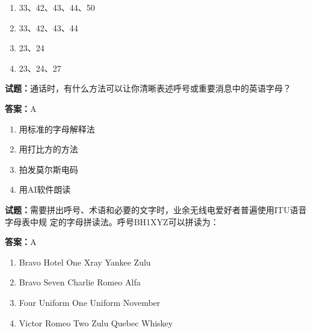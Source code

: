 \documentclass{ctexbook}
\begin{document}
\begin{enumerate}[leftmargin=3em]
  \item 33、42、43、44、50 

  \item 33、42、43、44 

  \item 23、24 

  \item 23、24、27 

\end{enumerate}





\vspace{1em}

\textbf{试题：}通话时，有什么方法可以让你清晰表述呼号或重要消息中的英语字母？ 

\textbf{答案：}A 

\begin{enumerate}[leftmargin=3em]
  \item 用标准的字母解释法 

  \item 用打比方的方法 

  \item 拍发莫尔斯电码 

  \item 用AI软件朗读 

\end{enumerate}





\vspace{1em}

\textbf{试题：}需要拼出呼号、术语和必要的文字时，业余无线电爱好者普遍使用ITU语音字母表中规
定的字母拼读法。呼号BH1XYZ可以拼读为： 

\textbf{答案：}A 

\begin{enumerate}[leftmargin=3em]
  \item Bravo Hotel One Xray Yankee Zulu 

  \item Bravo Seven Charlie Romeo Alfa 

  \item Four Uniform One Uniform November 

  \item Victor Romeo Two Zulu Quebec Whiskey 

\end{enumerate}
\end{document}
